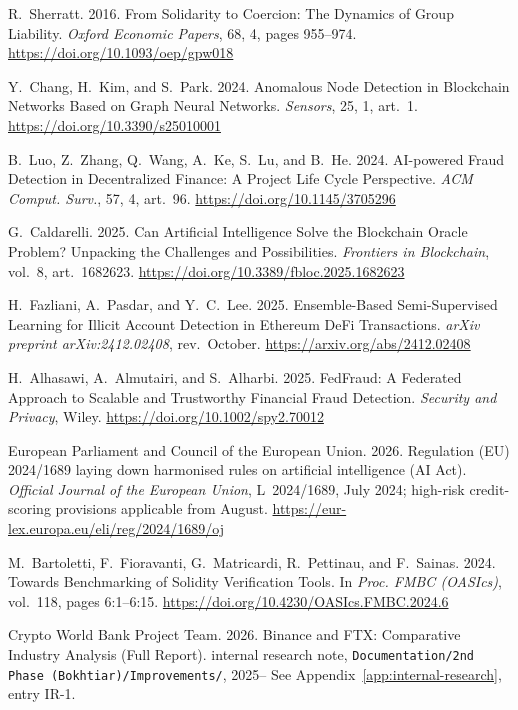 \documentclass[12pt,a4paper]{report}
\begin{document}
{\begin{enumerate}[label={[\arabic*]}]
\item R.~Sherratt. 2016. From Solidarity to Coercion: The Dynamics of Group Liability. \emph{Oxford Economic Papers}, 68, 4, pages 955--974. \url{https://doi.org/10.1093/oep/gpw018}

\item Y.~Chang, H.~Kim, and S.~Park. 2024. Anomalous Node Detection in Blockchain Networks Based on Graph Neural Networks. \emph{Sensors}, 25, 1, art.~1. \url{https://doi.org/10.3390/s25010001}

\item B.~Luo, Z.~Zhang, Q.~Wang, A.~Ke, S.~Lu, and B.~He. 2024. AI-powered Fraud Detection in Decentralized Finance: A Project Life Cycle Perspective. \emph{ACM Comput. Surv.}, 57, 4, art.~96. \url{https://doi.org/10.1145/3705296}

\item G.~Caldarelli. 2025. Can Artificial Intelligence Solve the Blockchain Oracle Problem? Unpacking the Challenges and Possibilities. \emph{Frontiers in Blockchain}, vol.~8, art.~1682623. \url{https://doi.org/10.3389/fbloc.2025.1682623}

\item H.~Fazliani, A.~Pasdar, and Y.~C.~Lee. 2025. Ensemble-Based Semi-Supervised Learning for Illicit Account Detection in Ethereum DeFi Transactions. \emph{arXiv preprint arXiv:2412.02408}, rev.~October. \url{https://arxiv.org/abs/2412.02408}

\item H.~Alhasawi, A.~Almutairi, and S.~Alharbi. 2025. FedFraud: A Federated Approach to Scalable and Trustworthy Financial Fraud Detection. \emph{Security and Privacy}, Wiley. \url{https://doi.org/10.1002/spy2.70012}

\item European Parliament and Council of the European Union. 2026. Regulation (EU) 2024/1689 laying down harmonised rules on artificial intelligence (AI Act). \emph{Official Journal of the European Union}, L~2024/1689, July 2024; high-risk credit-scoring provisions applicable from August. \url{https://eur-lex.europa.eu/eli/reg/2024/1689/oj}

\item M.~Bartoletti, F.~Fioravanti, G.~Matricardi, R.~Pettinau, and F.~Sainas. 2024. Towards Benchmarking of Solidity Verification Tools. In \emph{Proc. FMBC (OASIcs)}, vol.~118, pages 6:1--6:15. \url{https://doi.org/10.4230/OASIcs.FMBC.2024.6}

\item Crypto World Bank Project Team. 2026. Binance and FTX: Comparative Industry Analysis (Full Report). internal research note, \texttt{Documentation/2nd Phase (Bokhtiar)/Improvements/}, 2025-- See Appendix~\ref{app:internal-research}, entry IR-1.


\end{enumerate}}
\end{document}
